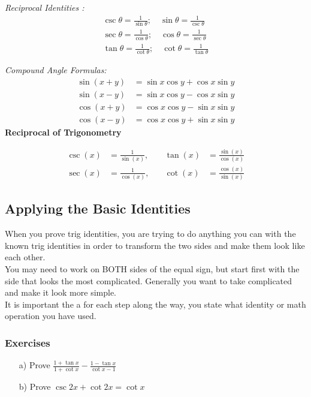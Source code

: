 \documentclass{article}
\begin{document}
\textit{Reciprocal Identities :}
$$
\begin{array}{ll}
\csc \theta=\frac{1}{\sin \theta} ; \quad \sin \theta=\frac{1}{\csc \theta} \\
\sec \theta=\frac{1}{\cos \theta} ; \quad \cos \theta=\frac{1}{\sec \theta} \\
\tan \theta=\frac{1}{\cot \theta} ; \quad \cot \theta=\frac{1}{\tan \theta}
\end{array}
$$

\textit{Compound Angle Formulas:}
$$
\begin{aligned}
\sin (x+y) & =\sin x \cos y+\cos x \sin y \\
\sin (x-y) & =\sin x \cos y-\cos x \sin y \\
\cos (x+y) & =\cos x \cos y-\sin x \sin y \\
\cos (x-y) & =\cos x \cos y+\sin x \sin y
\end{aligned}
$$
\textbf{Reciprocal of Trigonometry}
  \begin{spreadlines}{1.5ex}
    \begin{alignat*}{2}
      \csc(x) & = \tfrac 1 {\sin(x)}, \quad & \tan(x) & = \tfrac {\sin(x)} {\cos(x)} \\
      \sec(x) & = \tfrac 1 {\cos(x)}, \quad & \cot(x) & = \tfrac {\cos(x)} {\sin(x)}
    \end{alignat*}
  \end{spreadlines}
\subsection{Applying the Basic Identities}
When you prove trig identities, you are trying to do anything you can with the known trig identities in order to transform the two sides and make them look like each other.\\


You may need to work on BOTH sides of the equal sign, but start first with the side that looks the most complicated. Generally you want to take complicated and make it look more simple.\\


It is important the a for each step along the way, you state what identity or math operation you have used.

\subsubsection{Exercises}  
\begin{enumerate}
    \item[a)] Prove $\frac{1+\tan x}{1+\cot x}-\frac{1-\tan x}{\cot x-1}$ 
    \item[b)] Prove $\csc 2x+\cot 2x=\cot x$ 
\end{enumerate}
\end{document}
